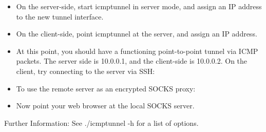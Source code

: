 \begin{itemize}
    \item On the server-side, start icmptunnel in server mode, and assign an IP address to the new tunnel interface.
    \item On the client-side, point icmptunnel at the server, and assign an IP address.
    \item At this point, you should have a functioning point-to-point tunnel via ICMP packets. The server side is 10.0.0.1, and the client-side is 10.0.0.2. On the client, try connecting to the server via SSH:
    \item To use the remote server as an encrypted SOCKS proxy:
    \item Now point your web browser at the local SOCKS server.
\end{itemize}
\vspace{1ex} 
Further Information: See ./icmptunnel -h for a list of options. 

